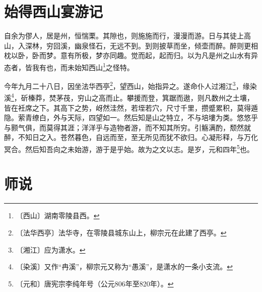 \documentclass[12pt,UTF-8,openany]{ctexbook}
\begin{document}
\chapter{始得西山宴游记}

\begin{normalsize}
    
    自余为僇人，居是州，恒惴栗。其隙也，则施施而行，漫漫而游。日与其徒上高山，入深林，穷回溪，幽泉怪石，无远不到。到则披草而坐，倾壶而醉。醉则更相枕以卧，卧而梦。意有所极，梦亦同趣。觉而起，起而归。以为凡是州之山水有异态者，皆我有也，而未始知西山\footnote{〔西山〕湖南零陵县西。}之怪特。
    
    今年九月二十八日，因坐法华西亭\footnote{〔法华西亭〕法华寺，在零陵县城东山上，柳宗元在此建了西亭。}，望西山，始指异之。遂命仆人过湘江\footnote{〔湘江〕应为潇水。}，缘染溪\footnote{〔染溪〕又作“冉溪”，柳宗元又称为“愚溪”，是潇水的一条小支流。}，斫榛莽，焚茅茷，穷山之高而止。攀援而登，箕踞而遨，则凡数州之土壤，皆在衽席之下。其高下之势，岈然洼然，若垤若穴，尺寸千里，攒蹙累积，莫得遁隐。萦青缭白，外与天际，四望如一。然后知是山之特立，不与培塿为类。悠悠乎与颢气俱，而莫得其涯；洋洋乎与造物者游，而不知其所穷。引觞满酌，颓然就醉，不知日之入。苍然暮色，自远而至，至无所见而犹不欲归。心凝形释，与万化冥合。然后知吾向之未始游，游于是乎始。故为之文以志。是岁，元和四年\footnote{〔元和〕唐宪宗李纯年号（公元806年至820年）。}也。
\end{normalsize}



\chapter{师说}
\end{document}
